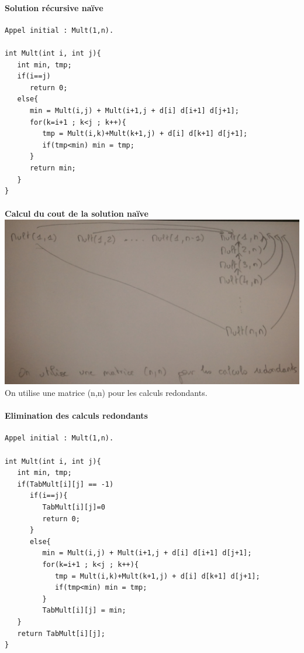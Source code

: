 \paragraph{Solution récursive naïve}

\begin{verbatim}
Appel initial : Mult(1,n).

int Mult(int i, int j){
   int min, tmp;
   if(i==j)
      return 0;
   else{
      min = Mult(i,j) + Mult(i+1,j + d[i] d[i+1] d[j+1];
      for(k=i+1 ; k<j ; k++){
         tmp = Mult(i,k)+Mult(k+1,j) + d[i] d[k+1] d[j+1];
         if(tmp<min) min = tmp;
      }
      return min;
   }
}
\end{verbatim}
\paragraph{}
\textbf{Calcul du cout de la solution naïve}\\
\includegraphics[width=15cm]{Photo0092}\\
On utilise une matrice (n,n) pour les calculs redondants.

\paragraph{Elimination des calculs redondants}
\begin{verbatim}
Appel initial : Mult(1,n).

int Mult(int i, int j){
   int min, tmp;
   if(TabMult[i][j] == -1)
      if(i==j){
         TabMult[i][j]=0
         return 0;
      }
      else{
         min = Mult(i,j) + Mult(i+1,j + d[i] d[i+1] d[j+1];
         for(k=i+1 ; k<j ; k++){
            tmp = Mult(i,k)+Mult(k+1,j) + d[i] d[k+1] d[j+1];
            if(tmp<min) min = tmp;
         }
         TabMult[i][j] = min;
   }
   return TabMult[i][j];
}
\end{verbatim}

